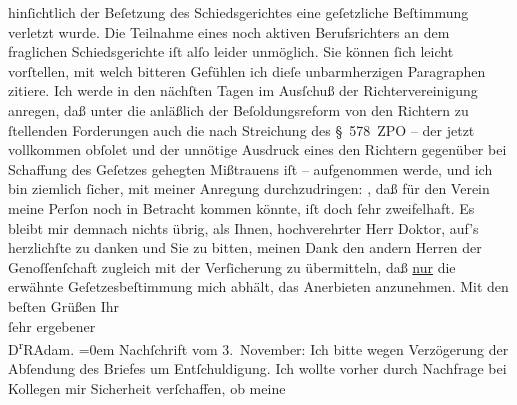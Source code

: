 \begin{ledgroupsized}[t]{13cm}
                    hinſichtlich der Beſetzung des Schiedsgerichtes eine geſetzliche Beſtimmung
                    verletzt wurde. Die Teilnahme eines noch aktiven Berufsrichters an dem
                    fraglichen Schiedsgerichte iſt alſo leider unmöglich.\pend
           \pstart
           Sie können ſich leicht vorſtellen, mit welch bitteren Gefühlen ich dieſe
                    unbarmherzigen Paragraphen zitiere.\pend
           \pstart
           Ich werde in den nächſten Tagen im Ausſchuß der Richtervereinigung anregen, daß unter die anläßlich der
                    Beſoldungsreform von den Richtern zu ſtellenden Forderungen auch die nach
                    Streichung des § 578 ZPO – der jetzt vollkommen obſolet und der unnötige
                    Ausdruck eines den Richtern gegenüber bei Schaffung des Geſetzes gehegten
                    Mißtrauens iſt – aufgenommen werde, und ich bin ziemlich ſicher, mit meiner
                    Anregung durchzudringen: \label{K_L02357_1v}\label{K_L02357_1h}, daß für den Verein meine Perſon noch in Betracht kommen könnte,
                    iſt doch ſehr zweifelhaft.\pend
           \pstart
           {\pb}Es bleibt mir demnach nichts übrig,
                    als Ihnen, hochverehrter Herr Doktor, auf’s herzlichſte zu danken und Sie zu
                    bitten, meinen Dank den andern Herren der Genoſſenſchaft zugleich mit der Verſicherung zu
                    übermitteln, daß \uline{nur} die erwähnte
                    Geſetzesbeſtimmung mich abhält, das Anerbieten anzunehmen.\pend
           \pstart
           Mit den beſten Grüßen Ihr{\\[\baselineskip]}ſehr ergebener{\\[\baselineskip]}\spacefill\mbox{D\textsuperscript{r}RAdam.}\pend
           \leftskip=0em{}\pstart
           \noindent{}Nachſchrift vom 3. November:\pend
           \pstart
           Ich bitte wegen Verzögerung der Abſendung des Briefes um Entſchuldigung. Ich
                    wollte vorher durch Nachfrage bei Kollegen mir Sicherheit verſchaffen, ob meine

\end{ledgroupsized}
